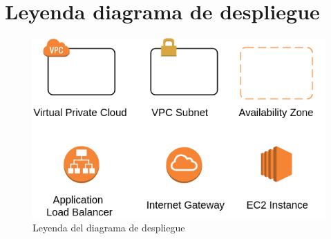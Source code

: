 \chapter{Leyenda diagrama de despliegue}
\begin{figure}
	\includegraphics[width=\linewidth]{Moduloss-leyenda.png}
	\caption{Leyenda del diagrama de despliegue}
	\label{fig:leyenda}
\end{figure}